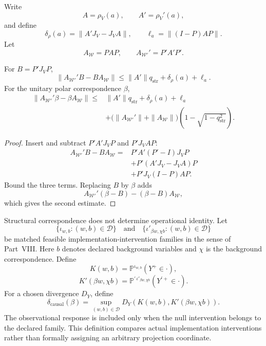 
Write
\[
A=\rho_V(a),
\qquad
A'=\rho_V'(a),
\]
and define
\[
\delta_\rho(a)=\|A'J_V-J_VA\|,
\qquad
\ell_a=\|(I-P)AP\|.
\]
Let
\[
A_{\mathcal W}=PAP,
\qquad
A_{\mathcal W'}'=P'A'P'.
\]

\begin{proposition}\label{prop:operation-transport-bound}
For \(B=P'J_VP\),
\[
\boxed{
\|A_{\mathcal W'}'B-BA_{\mathcal W}\|
\leq
\|A'\|q_{\mathrm{str}}
+\delta_\rho(a)
+\ell_a.
}
\]
For the unitary polar correspondence \(\beta\),
\[
\boxed{
\begin{aligned}
\|A_{\mathcal W'}'\beta-\beta A_{\mathcal W}\|
\leq
&\|A'\|q_{\mathrm{str}}
+\delta_\rho(a)
+\ell_a\\
&+
\bigl(\|A_{\mathcal W'}'\|+\|A_{\mathcal W}\|\bigr)
\left(1-\sqrt{1-q_{\mathrm{str}}^2}\right).
\end{aligned}
}
\]
\end{proposition}

\begin{proof}
Insert and subtract \(P'A'J_VP\) and \(P'J_VAP\):
\[
\begin{aligned}
A_{\mathcal W'}'B-BA_{\mathcal W}
={}&P'A'(P'-I)J_VP\\
&+P'(A'J_V-J_VA)P\\
&+P'J_V(I-P)AP.
\end{aligned}
\]
Bound the three terms. Replacing \(B\) by \(\beta\) adds
\[
A_{\mathcal W'}'(\beta-B)-(\beta-B)A_{\mathcal W},
\]
which gives the second estimate.
\end{proof}


Structural correspondence does not determine operational identity. Let
\[
\{\iota_{w,b}:(w,b)\in\mathcal D\}
\quad\text{and}\quad
\{\iota'_{\beta w,\chi b}:(w,b)\in\mathcal D\}
\]
be matched feasible implementation-intervention families in the sense of
Part~VIII. Here \(b\) denotes declared background variables and \(\chi\) is
the background correspondence. Define
\[
K(w,b)
=
\mathbb P^{\iota_{w,b}}(Y^+\in\cdot),
\]
\[
K'(\beta w,\chi b)
=
\mathbb P^{\prime\,\iota'_{\beta w,\chi b}}(Y^{\prime+}\in\cdot).
\]
For a chosen divergence \(D_Y\), define
\[
\boxed{
\delta_{\mathrm{causal}}(\beta)
=
\sup_{(w,b)\in\mathcal D}
D_Y\left(
K(w,b),
K'(\beta w,\chi b)
\right).
}
\]
The observational response is included only when the null intervention belongs
to the declared family. This definition compares actual implementation
interventions rather than formally assigning an arbitrary projection
coordinate.

